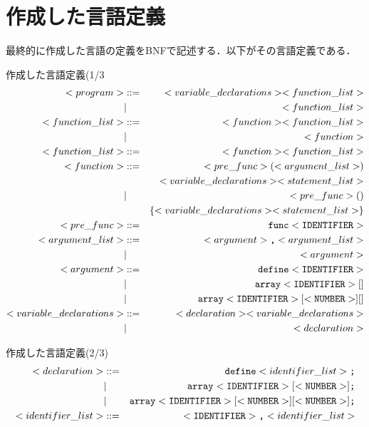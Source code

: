 \documentclass[a4paper,11pt]{jarticle}
\begin{document}
\section{作成した言語定義}
最終的に作成した言語の定義をBNFで記述する．以下がその言語定義である．
{\fontsize{10pt}{11pt} \selectfont
\begin{itembox}[l]{作成した言語定義(1/3}
\begin{eqnarray*}
  <program> &::=& <variable\_declarations> <function\_list> \\
    &|& <function\_list> \\
  <function\_list> &::=& <function> <function\_list> \\
    &|& <function> \\
  <function\_list> &::=& <function> <function\_list> \\
  <function> &::=& <pre\_func> (<argument\_list>) \\&&{<variable\_declarations> <statement\_list>} \\
  &|& <pre\_func> () \\&& \{ <variable\_declarations>  <statement\_list> \} \\
<pre\_func> &::=& \verb|func| <\verb|IDENTIFIER|> \\
<argument\_list> &::=& <argument>\verb|,| <argument\_list> \\
                  &|& <argument>\\
<argument> &::=& \verb|define| <\verb|IDENTIFIER|>\\
             &|& \verb|array| <\verb|IDENTIFIER|>[] \\
             &|& \verb|array| <\verb|IDENTIFIER|> [<\verb|NUMBER|>][] \\
<variable\_declarations> &::=& <declaration> <variable\_declarations>  \\
 &|& <declaration>\\
\end{eqnarray*}
\end{itembox}
\begin{itembox}[l]{作成した言語定義(2/3)}
\begin{eqnarray*}
<declaration> &::=& \verb|define| <identifier\_list>\verb|;|    \\
                &|& \verb|array| <\verb|IDENTIFIER|> [<\verb|NUMBER|>]\verb|;|  \\ 
                &|& \verb|array| <\verb|IDENTIFIER|> [<\verb|NUMBER|>][<\verb|NUMBER|>]\verb|;| \\
<identifier\_list> &::=& <\verb|IDENTIFIER|>\verb|,| <identifier\_list> \\

\end{eqnarray*}
\end{itembox}}
\end{document}
